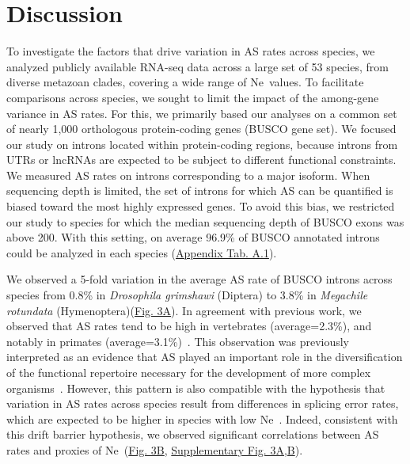 \section{Discussion}
To investigate the factors that drive variation in AS rates across species, we analyzed publicly available RNA-seq data across a large set of 53 species, from diverse metazoan clades, covering a wide range of \acrshort{Ne}~values. To facilitate comparisons across species, we sought to limit the impact of the among-gene variance in AS rates. For this, we primarily based our analyses on a common set of nearly 1,000 orthologous protein-coding genes (\acrshort{BUSCO} gene set). We focused our study on introns located within protein-coding regions, because introns from UTRs or lncRNAs are expected to be subject to different functional constraints. We measured AS rates on introns corresponding to a major isoform. When sequencing depth is limited, the set of introns for which AS can be quantified is biased toward the most highly expressed genes. To avoid this bias, we restricted our study to species for which the median sequencing depth of \acrshort{BUSCO} exons was above 200. With this setting, on average 96.9\% of \acrshort{BUSCO} annotated introns could be analyzed in each species (\hyperref[table:1]{Appendix Tab. A.1}).

We observed a 5-fold variation in the average AS rate of \acrshort{BUSCO} introns across species from 0.8\% in \textit{Drosophila grimshawi} (Diptera) to 3.8\% in \textit{Megachile rotundata} (Hymenoptera)(\hyperref[fig:AS3]{Fig. 3A}). In agreement with previous work, we observed that AS rates tend to be high in vertebrates (average=2.3\%), and notably in primates (average=3.1\%)~\citep{barbosa-morais_evolutionary_2012, chen_correcting_2014, mazin_alternative_2021}. This observation was previously interpreted as an evidence that AS played an important role in the diversification of the functional repertoire necessary for the development of more complex organisms~\citep{chen_correcting_2014}. However, this pattern is also compatible with the hypothesis that variation in AS rates across species result from differences in splicing error rates, which are expected to be higher in species with low \acrshort{Ne}~\citep{bush_alternative_2017}. Indeed, consistent with this drift barrier hypothesis, we observed significant correlations between AS rates and proxies of \acrshort{Ne}~(\hyperref[fig:AS3]{Fig. 3B}, \hyperref[supp_fig:AS3]{Supplementary Fig. 3A,B}).

